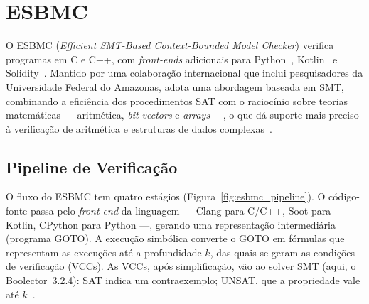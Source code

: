 \section{ESBMC}

O ESBMC (\textit{Efficient SMT-Based Context-Bounded Model Checker}) verifica
programas em C e C++, com \textit{front-ends} adicionais para
Python~\cite{Farias2024}, Kotlin~\cite{Menezes2022} e
Solidity~\cite{Menezes2024}. Mantido por uma colaboração internacional que inclui
pesquisadores da Universidade Federal do Amazonas, adota uma abordagem baseada em
SMT, combinando a eficiência dos procedimentos SAT com o raciocínio sobre teorias
matemáticas --- aritmética, \textit{bit-vectors} e \textit{arrays} ---, o que dá
suporte mais preciso à verificação de aritmética e estruturas de dados
complexas~\cite{Cordeiro2012}.

\subsection{Pipeline de Verificação}

O fluxo do ESBMC tem quatro estágios (Figura~\ref{fig:esbmc_pipeline}). O
código-fonte passa pelo \textit{front-end} da linguagem --- Clang para C/C++,
Soot para Kotlin, CPython para Python ---, gerando uma representação intermediária
(programa GOTO). A execução simbólica converte o GOTO em fórmulas que representam
as execuções até a profundidade $k$, das quais se geram as condições de
verificação (VCCs). As VCCs, após simplificação, vão ao solver SMT (aqui, o
Boolector~3.2.4): SAT indica um contraexemplo; UNSAT, que a propriedade vale até
$k$~\cite{Menezes2024}.

